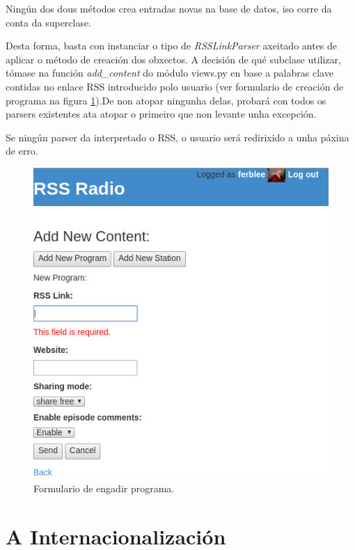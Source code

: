 Ningún dos dous métodos crea entradas novas na base de datos, iso corre da conta da superclase.

Desta forma, basta con instanciar o tipo de \textit{RSSLinkParser} axeitado antes de aplicar o método de creación dos obxectos. A decisión de qué subclase utilizar, tómase na función \textit{add\_content} do módulo views.py en base a palabras clave contidas no enlace RSS introducido polo usuario (ver formulario de creación de programa na figura \ref{fig:add_program}).De non atopar ningunha delas, probará con todos os parsers existentes ata atopar o primeiro que non levante unha excepción. 

Se ningún parser da interpretado o RSS, o usuario será redirixido a unha páxina de erro.

\begin{figure}[h]
	\centering
	\includegraphics[scale=0.6,keepaspectratio=true]{./images/add_program_final.png}
	\caption{Formulario de engadir programa.}
	\label{fig:add_program}
\end{figure} 

\section{A Internacionalización}

